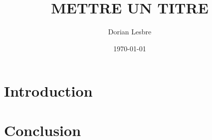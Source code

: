 \documentclass[12pt,a4paper]{article}
\title{METTRE UN TITRE}
\author{Dorian Lesbre}
\date{\today}
\begin{document}
\maketitle

\section{Introduction}



\section{Conclusion}






\end{document}
